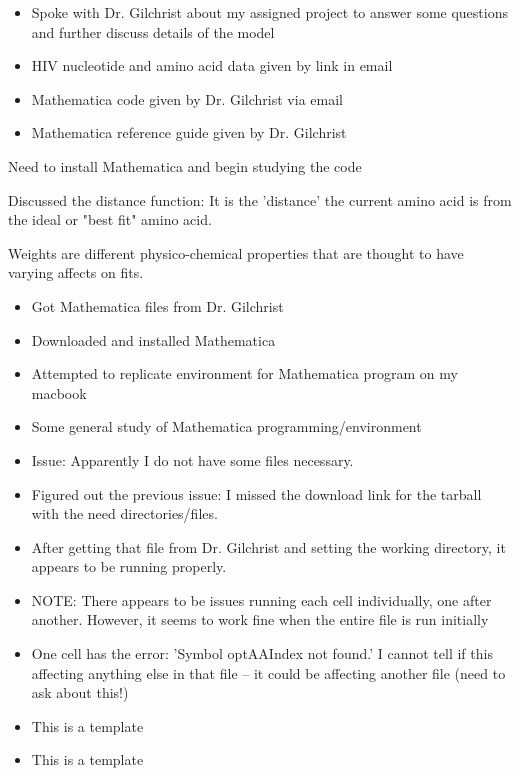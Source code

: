 \documentclass[12pt,hyperref]{labbook}
\begin{document}
\begin{itemize}
  \item Spoke with Dr. Gilchrist about my assigned project to answer some
questions and further discuss details of the model 
  \item HIV nucleotide and amino acid data given by link in email
  \item Mathematica code given by Dr. Gilchrist via email
  \item Mathematica reference guide given by Dr. Gilchrist
\end{itemize}
  \item Need to install Mathematica and begin studying the code
  \item Discussed the distance function: It is the 'distance' the current amino
acid is from the ideal or "best fit" amino acid. 
  \item Weights are different physico-chemical properties that are thought to
have varying affects on fits.
\begin{itemize}
\end{itemize}


\begin{itemize}
  \item Got Mathematica files from Dr. Gilchrist
  \item Downloaded and installed Mathematica
  \item Attempted to replicate environment for Mathematica program on my macbook 
  \item Some general study of Mathematica programming/environment
\end{itemize}
\begin{itemize}
  \item Issue: Apparently I do not have some files necessary.
\end{itemize}


\begin{itemize}
  \item Figured out the previous issue: I missed the download link for the
tarball with the need directories/files.
  \item After getting that file from Dr. Gilchrist and setting the working
directory, it appears to be running properly.  
\end{itemize}
\begin{itemize}
  \item NOTE: There appears to be issues running each cell individually, one
after another. However, it seems to work fine when the entire file is run
initially
  \item One cell has the error: 'Symbol optAAIndex not found.' I cannot tell if
this affecting anything else in that file -- it could be affecting another file
(need to ask about this!)
\end{itemize}

\begin{itemize}
  \item This is a template
\end{itemize}
\begin{itemize}
  \item This is a template
\end{itemize}


 
\end{document}
